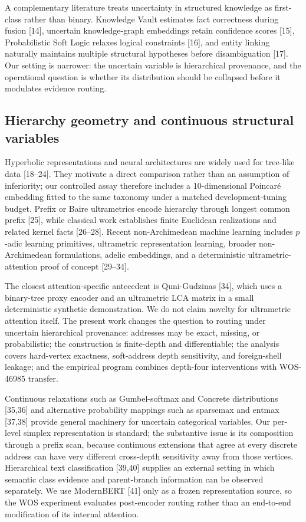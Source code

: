 \documentclass[preprint,11pt]{elsarticle}
\begin{document}
A complementary literature treats uncertainty in structured knowledge as first-class rather than binary. Knowledge Vault estimates fact correctness during fusion [14], uncertain knowledge-graph embeddings retain confidence scores [15], Probabilistic Soft Logic relaxes logical constraints [16], and entity linking naturally maintains multiple structural hypotheses before disambiguation [17]. Our setting is narrower: the uncertain variable is hierarchical provenance, and the operational question is whether its distribution should be collapsed before it modulates evidence routing.

\subsection{Hierarchy geometry and continuous structural variables}
Hyperbolic representations and neural architectures are widely used for tree-like data [18--24]. They motivate a direct comparison rather than an assumption of inferiority; our controlled assay therefore includes a 10-dimensional Poincar\'e embedding fitted to the same taxonomy under a matched development-tuning budget. Prefix or Baire ultrametrics encode hierarchy through longest common prefix [25], while classical work establishes finite Euclidean realizations and related kernel facts [26--28]. Recent non-Archimedean machine learning includes $p$-adic learning primitives, ultrametric representation learning, broader non-Archimedean formulations, adelic embeddings, and a deterministic ultrametric-attention proof of concept [29--34].

The closest attention-specific antecedent is Quni-Gudzinas [34], which uses a binary-tree proxy encoder and an ultrametric LCA matrix in a small deterministic synthetic demonstration. We do not claim novelty for ultrametric attention itself. The present work changes the question to routing under uncertain hierarchical provenance: addresses may be exact, missing, or probabilistic; the construction is finite-depth and differentiable; the analysis covers hard-vertex exactness, soft-address depth sensitivity, and foreign-shell leakage; and the empirical program combines depth-four interventions with WOS-46985 transfer.

Continuous relaxations such as Gumbel-softmax and Concrete distributions [35,36] and alternative probability mappings such as sparsemax and entmax [37,38] provide general machinery for uncertain categorical variables. Our per-level simplex representation is standard; the substantive issue is its composition through a prefix scan, because continuous extensions that agree at every discrete address can have very different cross-depth sensitivity away from those vertices. Hierarchical text classification [39,40] supplies an external setting in which semantic class evidence and parent-branch information can be observed separately. We use ModernBERT [41] only as a frozen representation source, so the WOS experiment evaluates post-encoder routing rather than an end-to-end modification of its internal attention.
\end{document}
